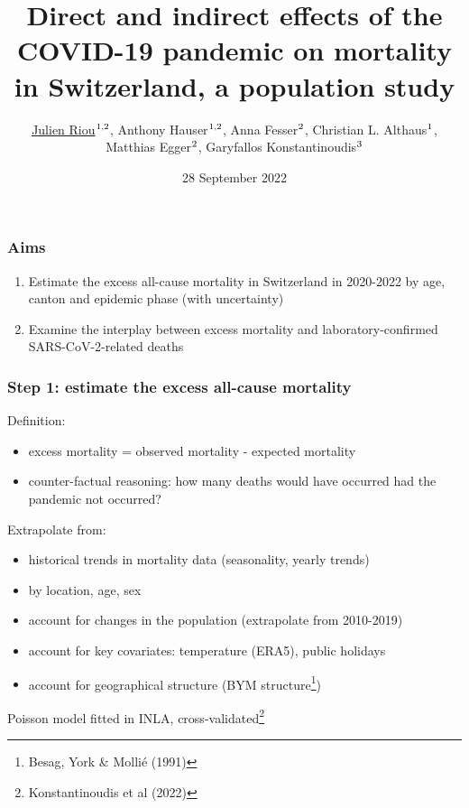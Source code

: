 \documentclass[10pt]{beamer}
\title{Direct and indirect effects of the COVID-19 pandemic on mortality in Switzerland, a population study}
\author{\underline{Julien Riou}$\textsuperscript{1,2}$, Anthony Hauser$\textsuperscript{1,2}$, Anna Fesser$\textsuperscript{2}$, Christian L. Althaus$\textsuperscript{1}$, Matthias Egger$\textsuperscript{2}$, Garyfallos Konstantinoudis$\textsuperscript{3}$}
\institute{$\textsuperscript{1}$ISPM, $\textsuperscript{2}$FOPH, $\textsuperscript{3}$Imperial College}
\date{ 28 September 2022 }
\begin{document}
\frame{\titlepage}


\begin{frame}
\frametitle{Aims}
\begin{enumerate}
	\item Estimate the \alert{excess all-cause mortality} in Switzerland in 2020-2022 by age, canton and epidemic phase (with uncertainty)
	\bigskip
	
	\item Examine the \alert{interplay} between excess mortality and laboratory-confirmed SARS-CoV-2-related deaths

\end{enumerate}
\end{frame}


\begin{frame}
\frametitle{Step 1: estimate the excess all-cause mortality}
Definition: 
\begin{itemize}
 \item excess mortality = observed mortality - expected mortality
 \item counter-factual reasoning: how many deaths would have occurred \alert{had the pandemic not occurred?}
\end{itemize}

\bigskip
Extrapolate from:
\begin{itemize}
	\item historical trends in mortality data (seasonality, yearly trends)
	\item by location, age, sex
	\item account for changes in the population (extrapolate from 2010-2019)
	\item account for key covariates: temperature (ERA5), public holidays
	\item account for geographical structure (BYM structure\footnote{Besag, York \& Mollié (1991)})
\end{itemize}
\bigskip
Poisson model fitted in INLA, cross-validated\footnote{Konstantinoudis et al (2022)}
\end{frame}
\end{document}

